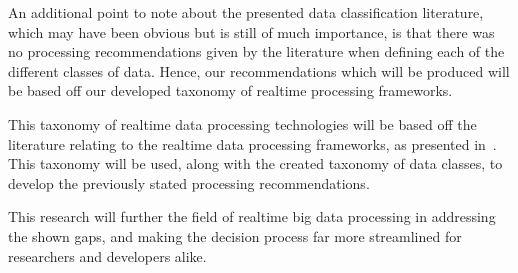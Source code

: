 An additional point to note about the presented data classification literature, which may have been obvious but is still
of much importance, is that there was no processing recommendations given by the literature when defining each of the
different classes of data. Hence, our recommendations which will be produced will be based off our developed taxonomy of
realtime processing frameworks.

This taxonomy of realtime data processing technologies will be based off the literature relating to the realtime data
processing frameworks, as presented in~. This taxonomy will be used, along with the
created taxonomy of data classes, to develop the previously stated processing recommendations.

This research will further the field of realtime big data processing in addressing the shown gaps, and making the
decision process far more streamlined for researchers and developers alike.


